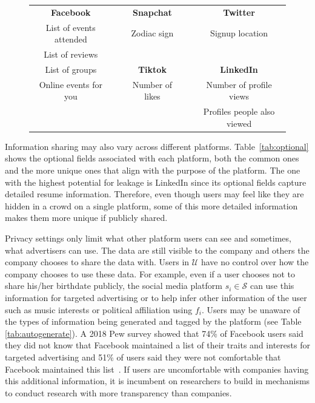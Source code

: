 \documentclass[11pt]{article} %
\begin{document}
\begin{figure}[tb]
\begin{minipage}{\textwidth}
        \label{tab:autogenerate-b}
        \begin{tabular}{ccccc} 
\textbf{Facebook}                &  & \textbf{Snapchat}        &  & \textbf{Twitter}                     \\ \cline{1-1} \cline{3-3} \cline{5-5} 
List of events attended &  & Zodiac sign     &  & Signup location             \\
List of reviews         &  &                 &  &                             \\
List of groups          &  & \textbf{Tiktok}          &  & \textbf{LinkedIn}                    \\ \cline{3-3} \cline{5-5} 
Online events for you   &  & Number of likes &  & Number of profile views     \\
                        &  &                 &  & Profiles people also viewed     
        \end{tabular} 
     \end{minipage}
\end{figure}

Information sharing may also vary across different platforms. Table~\ref{tab:optional} shows the optional fields associated with each platform, both the common ones and the more unique ones that align with the purpose of the platform. 
The one with the highest potential for leakage is LinkedIn since its optional fields capture detailed resume information. Therefore, even though users may feel like they are hidden in a crowd on a single platform, some of this more detailed information makes them more unique if publicly shared. 

Privacy settings only limit what other platform users can see and sometimes, what advertisers can use. The data are still visible to the company and others the company chooses to share the data with. Users in $\mathcal{U}$ have no control over how the company chooses to use these data. For example, even if a user chooses not to share his/her birthdate publicly, the social media platform $s_i \in \mathcal{S}$ can use this information for targeted advertising or to help infer other information of the user such as music interests or political affiliation using $f_i$. Users may be unaware of the types of information being generated and tagged by the platform (see Table \ref{tab:autogenerate}). A 2018 Pew survey showed that 74\% of Facebook users said they did not know that Facebook maintained a list of their traits and interests for targeted advertising and 51\% of users said they were not comfortable that Facebook maintained this list~\cite{FB_targetad}. If users are uncomfortable with companies having this additional information, it is incumbent on researchers to build in mechanisms to conduct research with more transparency than companies. 
\end{document}
